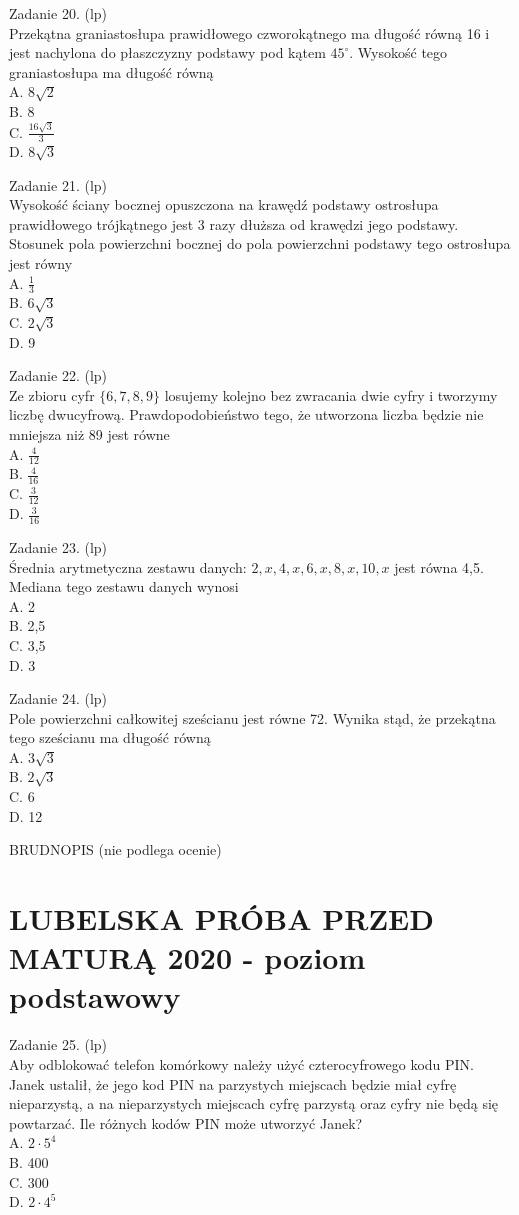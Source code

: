 \documentclass[10pt]{article}
\begin{document}
Zadanie 20. (lp)\\
Przekątna graniastosłupa prawidłowego czworokątnego ma długość równą 16 i jest nachylona do płaszczyzny podstawy pod kątem \(45^{\circ}\). Wysokość tego graniastosłupa ma długość równą\\
A. \(8 \sqrt{2}\)\\
B. 8\\
C. \(\frac{16 \sqrt{3}}{3}\)\\
D. \(8 \sqrt{3}\)

Zadanie 21. (lp)\\
Wysokość ściany bocznej opuszczona na krawędź podstawy ostrosłupa prawidłowego trójkątnego jest 3 razy dłuższa od krawędzi jego podstawy. Stosunek pola powierzchni bocznej do pola powierzchni podstawy tego ostrosłupa jest równy\\
A. \(\frac{1}{3}\)\\
B. \(6 \sqrt{3}\)\\
C. \(2 \sqrt{3}\)\\
D. 9

Zadanie 22. (lp)\\
Ze zbioru cyfr \(\{6,7,8,9\}\) losujemy kolejno bez zwracania dwie cyfry i tworzymy liczbę dwucyfrową. Prawdopodobieństwo tego, że utworzona liczba będzie nie mniejsza niż 89 jest równe\\
A. \(\frac{4}{12}\)\\
B. \(\frac{4}{16}\)\\
C. \(\frac{3}{12}\)\\
D. \(\frac{3}{16}\)

Zadanie 23. (lp)\\
Średnia arytmetyczna zestawu danych: \(2, x, 4, x, 6, x, 8, x, 10, x\) jest równa 4,5. Mediana tego zestawu danych wynosi\\
A. 2\\
B. 2,5\\
C. 3,5\\
D. 3

Zadanie 24. (lp)\\
Pole powierzchni całkowitej sześcianu jest równe 72. Wynika stąd, że przekątna tego sześcianu ma długość równą\\
A. \(3 \sqrt{3}\)\\
B. \(2 \sqrt{3}\)\\
C. 6\\
D. 12

BRUDNOPIS (nie podlega ocenie)

\section*{LUBELSKA PRÓBA PRZED MATURĄ 2020 - poziom podstawowy}
Zadanie 25. (lp)\\
Aby odblokować telefon komórkowy należy użyć czterocyfrowego kodu PIN. Janek ustalił, że jego kod PIN na parzystych miejscach będzie miał cyfrę nieparzystą, a na nieparzystych miejscach cyfrę parzystą oraz cyfry nie będą się powtarzać. Ile różnych kodów PIN może utworzyć Janek?\\
A. \(2 \cdot 5^{4}\)\\
B. 400\\
C. 300\\
D. \(2 \cdot 4^{5}\)
\end{document}
